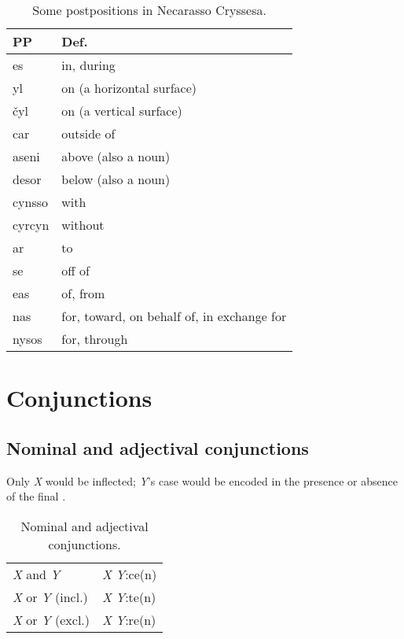 \documentclass{book}
\begin{document}
\begin{table}[H]
  \caption{Some postpositions in Necarasso Cryssesa.}
  \centering
  \begin{tabu} to \linewidth {|l|X|}
    \hline
    PP & Def. \\
    \hline
    es & in, during \\
    yl & on (a horizontal surface) \\
    čyl & on (a vertical surface) \\
    car & outside of \\
    aseni & above (also a noun) \\
    desor & below (also a noun) \\
    cynsso & with \\
    cyrcyn & without \\
    ar & to \\
    se & off of \\
    eas & of, from \\
    nas & for, toward, on behalf of, in exchange for \\
    nysos & for, through \\
    \hline
  \end{tabu}
\end{table}

\chapter{Conjunctions}

\section{Nominal and adjectival conjunctions}

Only \emph{X} would be inflected; \emph{Y}'s case would be encoded in the presence or absence of the final .

\begin{table}[ht]
  \caption{Nominal and adjectival conjunctions.}
  \centering
	\begin{tabular}{|l|l|}
	  \hline
	  \emph{X} and \emph{Y} & \emph{X} \emph{Y}:ce(n) \\
	  \emph{X} or \emph{Y} (incl.) & \emph{X} \emph{Y}:te(n) \\
	  \emph{X} or \emph{Y} (excl.) & \emph{X} \emph{Y}:re(n) \\ \hline
	\end{tabular}
\end{table}
\end{document}
